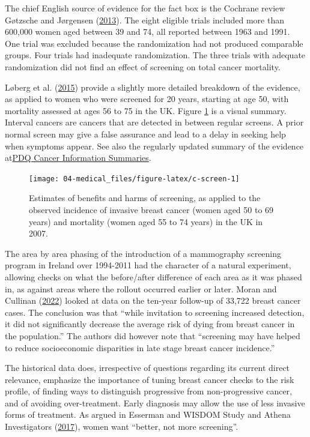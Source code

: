 \documentclass[
  10pt,
  b5paper]{book}
\begin{document}
The chief English source of evidence for the fact box is the Cochrane
review Gøtzsche and Jørgensen (\protect\hyperlink{ref-gotzsche2013screening}{2013}). The eight eligible trials included more
than 600,000 women aged between 39 and 74, all reported between 1963 and
1991. One trial was excluded because the randomization had not produced
comparable groups. Four trials had inadequate randomization. The three
trials with adequate randomization did not find an effect of screening
on total cancer mortality.

Løberg et al. (\protect\hyperlink{ref-loberg2015benefits}{2015}) provide a slightly more detailed breakdown of the
evidence, as applied to women who were screened for 20 years, starting
at age 50, with mortality assessed at ages 56 to 75 in the UK. Figure
\ref{fig:c-screen} is a visual summary. Interval cancers are cancers
that are detected in between regular screens. A prior normal screen may
give a false assurance and lead to a delay in seeking help when symptoms
appear. See also the regularly updated summary of the evidence at\href{https://www.ncbi.nlm.nih.gov/books/NBK65906/}{PDQ
Cancer Information
Summaries}.

\begin{figure}[H]

{\centering \texttt{[image: 04-medical\_files/figure-latex/c-screen-1]} 

}

\caption{Estimates of benefits and harms of screening, as applied to the observed incidence of invasive breast cancer (women aged 50 to 69 years) and mortality (women aged 55 to 74 years) in the UK in 2007.}\label{fig:c-screen}
\end{figure}

The area by area phasing of the introduction of a mammography screening
program in Ireland over 1994-2011 had the character of a natural
experiment, allowing checks on what the before/after difference of each
area as it was phased in, as against areas where the rollout occurred
earlier or later. Moran and Cullinan (\protect\hyperlink{ref-MORAN2022115073}{2022}) looked at data on the ten-year
follow-up of 33,722 breast cancer cases. The conclusion was that ``while
invitation to screening increased detection, it did not significantly
decrease the average risk of dying from breast cancer in the
population.'' The authors did however note that ``screening may have
helped to reduce socioeconomic disparities in late stage breast cancer
incidence.''

The historical data does, irrespective of questions regarding its
current direct relevance, emphasize the importance of tuning breast
cancer checks to the risk profile, of finding ways to distinguish
progressive from non-progressive cancer, and of avoiding over-treatment.
Early diagnosis may allow the use of less invasive forms of treatment.
As argued in Esserman and WISDOM Study and Athena Investigators (\protect\hyperlink{ref-essermanwisdom}{2017}), women want ``better, not more screening''.
\end{document}
